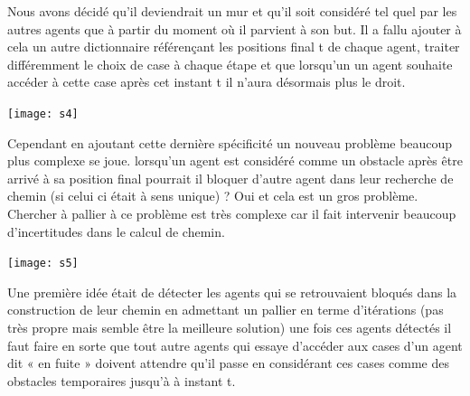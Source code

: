 \documentclass{article}
\begin{document}
Nous avons décidé qu’il deviendrait un mur et qu’il soit considéré tel quel par les autres agents que à partir du moment où il parvient à son but. Il a fallu ajouter à cela un autre dictionnaire référençant les positions final t de chaque agent, traiter différemment le choix de case à chaque étape et que lorsqu’un un agent souhaite accéder à cette case après cet instant t il n’aura désormais plus le droit. 
\\
\begin{center}
	\texttt{[image: s4]}
\end{center}

Cependant en ajoutant cette dernière spécificité un nouveau problème beaucoup plus complexe se joue. lorsqu’un agent est considéré comme un obstacle après être arrivé à sa position final pourrait il bloquer d’autre agent dans leur recherche de chemin (si celui ci était à sens unique) ? Oui et cela est un gros problème. Chercher à pallier à ce problème est très complexe car il fait intervenir beaucoup d’incertitudes dans le calcul de chemin. \\

\begin{center}
	\texttt{[image: s5]}
\end{center}

Une première idée était de détecter les agents qui se retrouvaient bloqués dans la construction de leur chemin en admettant un pallier en terme d’itérations (pas très propre mais semble être la meilleure solution) une fois ces agents détectés il faut faire en sorte que tout autre agents qui essaye d’accéder aux cases d’un agent dit « en fuite » doivent attendre qu’il passe en considérant ces cases comme des obstacles temporaires jusqu'à à instant t.
\end{document}
